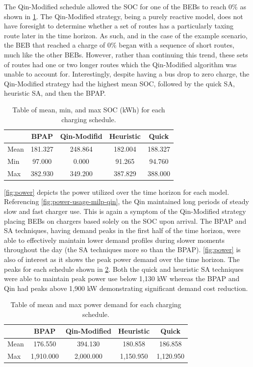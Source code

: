 \documentclass[ee,thesis]{usuthesis}
\begin{document}
The Qin-Modified schedule allowed the SOC for one of the BEBs to reach 0\% as shown in \ref{tab:charge}. The Qin-Modified
strategy, being a purely reactive model, does not have foresight to determine whether a set of routes has a particularly
taxing route later in the time horizon. As such, and in the case of the example scenario, the BEB that reached a charge
of 0\% began with a sequence of short routes, much like the other BEBs. However, rather than continuing this trend, these
sets of routes had one or two longer routes which the Qin-Modified algorithm was unable to account for. Interestingly,
despite having a bus drop to zero charge, the Qin-Modified strategy had the highest mean SOC, followed by the quick SA,
heuristic SA, and then the BPAP.

\begin{table}[htbp]
\caption{\label{tab:charge}Table of mean, min, and max SOC (kWh) for each charging schedule.}
\centering
\begin{tabular}{l|cccc}
\hline
 & BPAP & Qin-Modifid & Heuristic & Quick\\[0pt]
\hline
Mean & 181.327 & 248.864 & 182.004 & 188.327\\[0pt]
Min & 97.000 & 0.000 & 91.265 & 94.760\\[0pt]
Max & 382.930 & 349.200 & 387.829 & 388.000\\[0pt]
\hline
\end{tabular}
\end{table}

\ref{fig:power} depicts the power utilized over the time horizon for each model. Referencing
\ref{fig:power-usage-milp-qin}, the Qin maintained long periods of steady slow and fast charger use. This is again a
symptom of the Qin-Modified strategy placing BEBs on chargers based solely on the SOC upon arrival. The BPAP and SA
techniques, having demand peaks in the first half of the time horizon, were able to effectively maintain lower demand
profiles during slower moments throughout the day (the SA techniques more so than the BPAP). \ref{fig:power} is also of
interest as it shows the peak power demand over the time horizon. The peaks for each schedule shown in \ref{tab:power}.
Both the quick and heuristic SA techniques were able to maintain peak power use below 1,130 kW whereas the BPAP and Qin
had peaks above 1,900 kW demonstrating significant demand cost reduction.

\begin{table}[htbp]
\caption{\label{tab:power}Table of mean and max power demand for each charging schedule.}
\centering
\begin{tabular}{l|cccc}
\hline
 & BPAP & Qin-Modified & Heuristic & Quick\\[0pt]
\hline
Mean & 176.550 & 394.130 & 180.858 & 186.858\\[0pt]
Max & 1,910.000 & 2,000.000 & 1,150.950 & 1,120.950\\[0pt]
\hline
\end{tabular}
\end{table}
\end{document}
